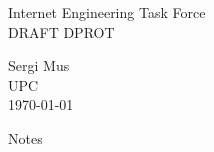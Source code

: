 \documentclass[10pt]{article}
\newcommand{\rfcId}{DPROT}
\newcommand{\rfcTitle}{Notes}
\newcommand{\rfcAuthor}{Sergi Mus}
\newcommand{\rfcDate}{\today}
\newcommand{\rfcInstitution}{UPC}
\begin{document}
\begin{multicols}{2}
	\begin{flushleft}
		Internet Engineering Task Force \\
		DRAFT \rfcId
	\end{flushleft}
\columnbreak
	\begin{flushright}
		\rfcAuthor \\
		\rfcInstitution \\
		\rfcDate
	\end{flushright}
\end{multicols}

\vspace{1in} { \center \rfcTitle \\ } \vspace{1in}

\begin{abstract}
  This document contains the notes for the subject of Data Protection. In it we study in depth cryptography both symetric and assymetric cryptography. 
	\lipsum[1]
\end{abstract}
\pagebreak

\tableofcontents
\pagebreak
\end{document}
